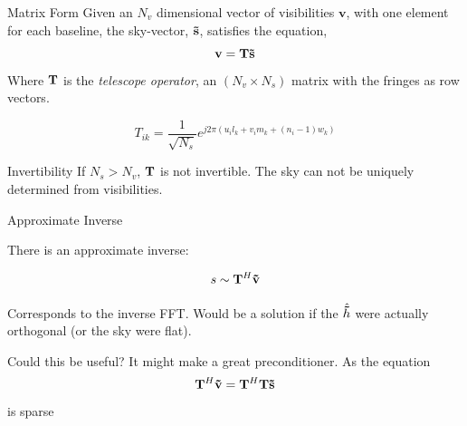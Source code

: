 \documentclass[ignorenonframetext]{beamer}
\begin{document}
\begin{frame}{Matrix Form}
 Given an $N_v$ dimensional vector of visibilities $\mathbf{v}$, with one element for each baseline, the sky-vector, $\mathbf{\vec{s}}$, satisfies the equation,
\begin{equation}
\mathbf{v} = \mathbf{T} \mathbf{\vec{s}}
\label{eqn:telescope_operator_pixel_basis}
\end{equation}
Where $\mathbf{T}$ is the {\em telescope operator}, an $(N_v \times N_s)$ matrix with the fringes as row vectors. 

\[ T_{ik} = \frac{1}{\sqrt{N_s}} e^{j 2 \pi \left( u_i l_k  + v_i m_k + (n_i - 1) w_k \right)} \]
\begin{block}{Invertibility}
If $N_s > N_v$,  $\mathbf{T}$ is not invertible. The sky can not be uniquely determined from visibilities.
\end{block}

\end{frame}

% 

\begin{frame}{Approximate Inverse}

There is an approximate inverse:

 \[ s \sim \mathbf{T}^H \mathbf{\vec{v}} \]
 
 Corresponds to the inverse FFT. Would be a solution if the $\hat{\mathbf{\vec{h}}}$ were actually orthogonal (or the sky were flat).
 
 \begin{block}{Could this be useful?}
  It might make a great preconditioner. As the equation
  \[ \mathbf{T}^H \mathbf{\vec{v}} = \mathbf{T}^H \mathbf{T} \mathbf{\vec{s}} \]
  is sparse
 \end{block}
\end{frame}
\end{document}
